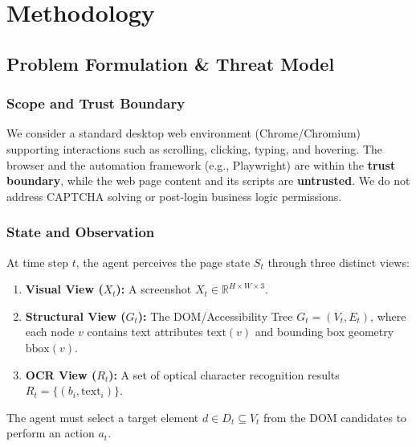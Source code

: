 \documentclass[runningheads]{llncs}
\begin{document}
\section{Methodology}

\subsection{Problem Formulation \& Threat Model}

\subsubsection{Scope and Trust Boundary}
We consider a standard desktop web environment (Chrome/Chromium) supporting interactions such as scrolling, clicking, typing, and hovering. The browser and the automation framework (e.g., Playwright) are within the \textbf{trust boundary}, while the web page content and its scripts are \textbf{untrusted}. We do not address CAPTCHA solving or post-login business logic permissions.

\subsubsection{State and Observation}
At time step $t$, the agent perceives the page state $S_t$ through three distinct views:
\begin{enumerate}
    \item \textbf{Visual View ($X_t$):} A screenshot $X_t \in \mathbb{R}^{H\times W\times 3}$.
    \item \textbf{Structural View ($G_t$):} The DOM/Accessibility Tree $G_t=(V_t, E_t)$, where each node $v$ contains text attributes $\text{text}(v)$ and bounding box geometry $\text{bbox}(v)$.
    \item \textbf{OCR View ($R_t$):} A set of optical character recognition results $R_t=\{(b_i, \text{text}_i)\}$.
\end{enumerate}
The agent must select a target element $d \in D_t \subseteq V_t$ from the DOM candidates to perform an action $a_t$.
\end{document}
